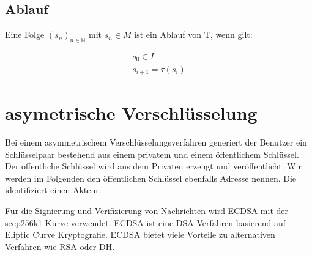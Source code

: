 \documentclass[a4paper,12pt]{report}
\begin{document}
\subsection*{Ablauf}
Eine Folge $(s_n)_{n\in\mathbb{N}}$ mit $s_n\in M$ ist ein Ablauf von T, wenn gilt:

\begin{eqnarray}
   s_0 \in I \\
   s_{i+1} = \tau(s_i) 
\end{eqnarray}


\section{asymetrische Verschlüsselung}
\label{crypt}


Bei einem asymmetrischem Verschlüsselungsverfahren generiert der Benutzer ein Schlüsselpaar bestehend aus einem privatem und einem öffentlichem Schlüssel. Der öffentliche Schlüssel wird aus dem Privaten erzeugt und veröffentlicht. Wir werden im Folgenden den öffentlichen Schlüssel ebenfalls Adresse nennen. Die identifiziert einen Akteur.

Für die Signierung und Verifizierung von Nachrichten wird ECDSA mit der secp256k1 Kurve verwendet. ECDSA ist eine DSA Verfahren basierend auf Eliptic Curve Kryptografie. ECDSA bietet viele Vorteile zu alternativen Verfahren wie RSA oder DH.\cite{Pouillard2014}
% 
% 
% 
% 
\end{document}
